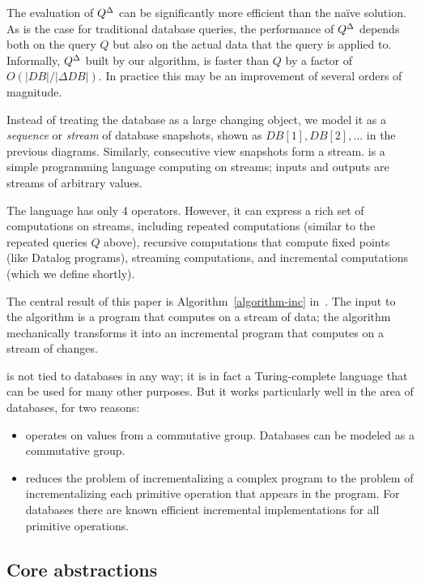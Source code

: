 The evaluation of ${Q}^{\Delta}$ can be significantly more efficient than
the na\"ive solution.  As is the case for traditional database
queries, the performance of ${Q}^{\Delta}$ depends both on the query $Q$
but also on the actual data that the query is applied to.  Informally,
${Q}^{\Delta}$ built by our algorithm, is faster than $Q$ by a factor of
$O(|DB| / |\Delta DB|)$.  In practice this may be an improvement of
several orders of magnitude.

Instead of treating the database as a large changing object, we model
it as a \emph{sequence} or \emph{stream} of database snapshots, shown
as $DB[1], DB[2], \ldots$ in the previous diagrams.  Similarly,
consecutive view snapshots form a stream.  \dbsp is a simple
programming language computing on streams; inputs and outputs are
streams of arbitrary values.

The \dbsp language has only 4 operators.  However, it can express a
rich set of computations on streams, including repeated computations
(similar to the repeated queries $Q$ above), recursive computations
that compute fixed points (like Datalog programs), streaming
computations, and incremental computations (which we define shortly).

The central result of this paper is Algorithm~\ref{algorithm-inc}
in~.  The input to the algorithm is a \dbsp
program that computes on a stream of data; the algorithm mechanically
transforms it into an incremental \dbsp program that computes on a
stream of changes.

\dbsp is not tied to databases in any way; it is in fact a
Turing-complete language that can be used for many other purposes.
But it works particularly well in the area of databases, for two
reasons:

\begin{itemize}[nosep, leftmargin=0pt, itemindent=0.5cm]
  \item \dbsp operates on values from a commutative group.  Databases
    can be modeled as a commutative group.
  \item \dbsp reduces the problem of incrementalizing a complex
    program to the problem of incrementalizing each primitive
    operation that appears in the program.  For databases there are
    known efficient incremental implementations for all primitive
    operations.
\end{itemize}

\subsection{Core abstractions}

